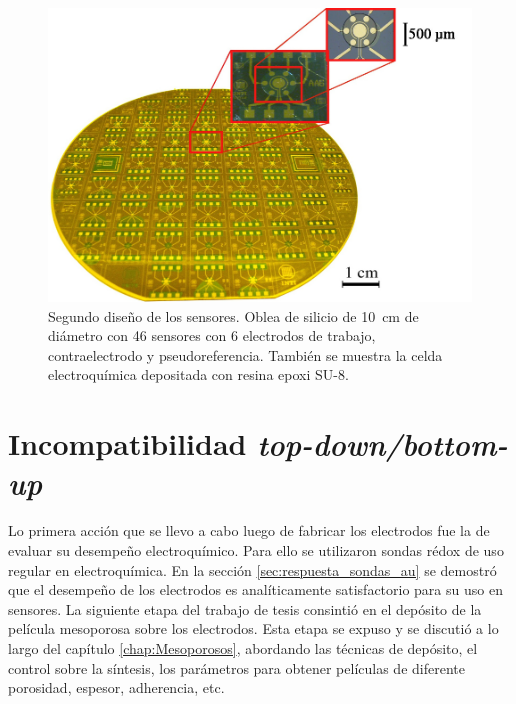 					  \begin{figure}[h!]
					  \begin{center}
					  \includegraphics[width=\textwidth]{Imagenes/ObleaV2.jpg}
					  \caption[Electrodos, segunda versión]{Segundo diseño de los sensores. Oblea de silicio de \SI{10}{cm} de diámetro con 46 sensores con 6 electrodos de trabajo, contraelectrodo y pseudoreferencia. También se muestra la celda electroquímica depositada con resina epoxi SU-8.}
					  \label{fig:ObleaV2}
					  \end{center}
					  \end{figure} 	
	
\section{Incompatibilidad \textit{top-down/bottom-up}}

  			Lo primera acción que se llevo a cabo luego de fabricar los electrodos fue la de evaluar su desempeño electroquímico. Para ello se utilizaron sondas rédox de uso regular en electroquímica. En la sección \ref{sec:respuesta_sondas_au} se demostró que el desempeño de los electrodos es analíticamente satisfactorio para su uso en sensores. La siguiente etapa del trabajo de tesis consintió en el depósito de la película mesoporosa sobre los electrodos. Esta etapa se expuso y se discutió a lo largo del capítulo \ref{chap:Mesoporosos}, abordando las técnicas de depósito, el control sobre la síntesis, los parámetros para obtener películas de diferente porosidad, espesor, adherencia, etc.

